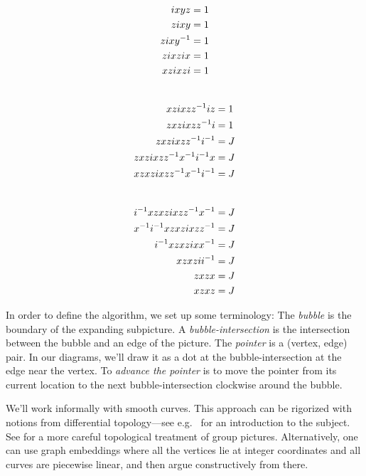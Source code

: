 \begin{figure}
\begin{multicols}{3}
	~\begin{align}
		\label{eq:quant-van-kampen-0}
		ixyz &= 1\\
		zixy &= 1\label{eq:quant-van-kampen-1}\\
		zixy^{-1} &= 1\label{eq:quant-van-kampen-2}\\
		zixzix &= 1\label{eq:quant-van-kampen-3}\\
		xzixzi &= 1\label{eq:quant-van-kampen-4}
	\end{align}
	~\begin{align}
		xzixzz^{-1}iz &= 1\label{eq:quant-van-kampen-5}\\
		zxzixzz^{-1}i &= 1\label{eq:quant-van-kampen-6}\\
		zxzixzz^{-1}i^{-1} &= J\label{eq:quant-van-kampen-7}\\
		zxzixzz^{-1}x^{-1}i^{-1}x &= J\label{eq:quant-van-kampen-8}\\
		xzxzixzz^{-1}x^{-1}i^{-1} &= J\label{eq:quant-van-kampen-8b}
	\end{align}
	~\begin{align}
		i^{-1}xzxzixzz^{-1}x^{-1} &= J\label{eq:quant-van-kampen-8c}\\
		x^{-1}i^{-1}xzxzixzz^{-1} &= J\label{eq:quant-van-kampen-9}\\
		i^{-1}xzxzixx^{-1} &= J\label{eq:quant-van-kampen-10}\\
		xzxzii^{-1} &= J\label{eq:quant-van-kampen-11}\\
		zxzx &= J\label{eq:quant-van-kampen-12a}\\
		xzxz &= J\label{eq:quant-van-kampen-12}
	\end{align}
\end{multicols}
\end{figure}
\label{fig:quant-van-kampen}
In order to define the algorithm, we set up some terminology:
The \emph{bubble} is the boundary of the expanding subpicture. A \emph{bubble-intersection} is the intersection between the bubble and an edge of the picture. The \emph{pointer} is a (vertex, edge) pair. In our diagrams, we'll draw it as a dot at the bubble-intersection at the edge near the vertex.
To \emph{advance the pointer} is to move the pointer from its current location to the next bubble-intersection clockwise around the bubble. 

We'll work informally with smooth curves. This approach can be rigorized with notions from differential topology---see e.g.\ \cite{guillemin2010differential} for an introduction to the subject. See \cite{slofstra2016tsirelson} for a more careful topological treatment of group pictures. 
Alternatively, one can use graph embeddings where all the vertices lie at integer coordinates and all curves are piecewise linear, and then argue constructively from there.

